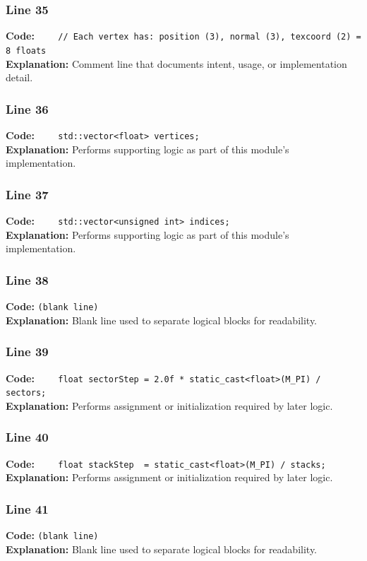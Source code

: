 \documentclass[11pt,a4paper]{article}
\begin{document}
\subsubsection*{Line 35}
\textbf{Code:} \verb|    // Each vertex has: position (3), normal (3), texcoord (2) = 8 floats|\\
\textbf{Explanation:} Comment line that documents intent, usage, or implementation detail.

\subsubsection*{Line 36}
\textbf{Code:} \verb|    std::vector<float> vertices;|\\
\textbf{Explanation:} Performs supporting logic as part of this module's implementation.

\subsubsection*{Line 37}
\textbf{Code:} \verb|    std::vector<unsigned int> indices;|\\
\textbf{Explanation:} Performs supporting logic as part of this module's implementation.

\subsubsection*{Line 38}
\textbf{Code:} \texttt{(blank line)}\\
\textbf{Explanation:} Blank line used to separate logical blocks for readability.

\subsubsection*{Line 39}
\textbf{Code:} \verb|    float sectorStep = 2.0f * static_cast<float>(M_PI) / sectors;|\\
\textbf{Explanation:} Performs assignment or initialization required by later logic.

\subsubsection*{Line 40}
\textbf{Code:} \verb|    float stackStep  = static_cast<float>(M_PI) / stacks;|\\
\textbf{Explanation:} Performs assignment or initialization required by later logic.

\subsubsection*{Line 41}
\textbf{Code:} \texttt{(blank line)}\\
\textbf{Explanation:} Blank line used to separate logical blocks for readability.
\end{document}
